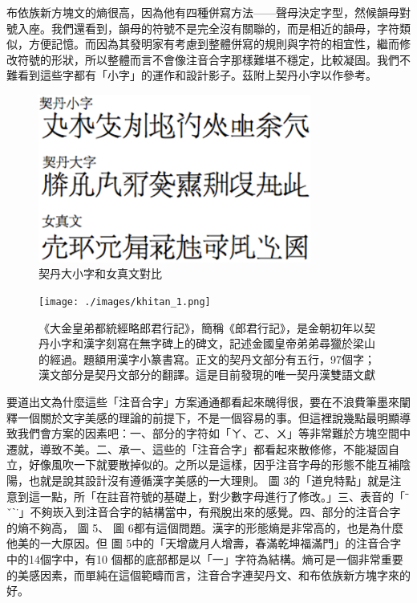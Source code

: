 \documentclass[a5paper, 10pt, openany]{book} %
\begin{document}
布依族新方塊文的熵很高，因為他有四種併寫方法——聲母決定字型，然候韻母對號入座。我們還看到，韻母的符號不是完全沒有關聯的，而是相近的韻母，字符類似，方便記憶。而因為其發明家有考慮到整體併寫的規則與字符的相宜性，繼而修改符號的形狀，所以整體而言不會像注音合字那樣難堪不穩定，比較凝固。我們不難看到這些字都有「小字」的運作和設計影子。茲附上契丹小字以作參考。

\begin{figure}[h]
  \centering
  \includegraphics[width=0.8\textwidth]{./images/gujinwenzijicheng.png}
  \caption{契丹大小字和女真文對比}
\end{figure}


\begin{figure}[h]
  \centering
  \texttt{[image: ./images/khitan\_1.png]}
  \caption{《大金皇弟都統經略郎君行記》，簡稱《郎君行記》，是金朝初年以契丹小字和漢字刻寫在無字碑上的碑文，記述金國皇帝弟弟尋獵於梁山的經過。題額用漢字小篆書寫。正文的契丹文部分有五行，97個字；漢文部分是契丹文部分的翻譯。這是目前發現的唯一契丹漢雙語文獻}
\end{figure}

 

 

要道出文為什麼這些「注音合字」方案通通都看起來醜得很，要在不浪費筆墨來闡釋一個關於文字美感的理論的前提下，不是一個容易的事。但這裡說幾點最明顯導致我們會方案的因素吧：一、部分的字符如「ㄚ、ㄛ、ㄨ」等非常難於方塊空間中遷就，導致不美。二、承一、這些的「注音合字」都看起來散修修，不能凝固自立，好像風吹一下就要散掉似的。之所以是這樣，因乎注音字母的形態不能互補陰陽，也就是說其設計沒有遵循漢字美感的一大理則。
圖 3的「道皃特點」就是注意到這一點，所「在註音符號的基礎上，對少數字母進行了修改。」三、表音的「ˉ ˇˋ˙」不夠崁入到注音合字的結構當中，有飛脫出來的感覺。四、部分的注音合字的熵不夠高，
圖 5、
圖 6都有這個問題。漢字的形態熵是非常高的，也是為什麼他美的一大原因。但
圖 5中的「天增歲月人增壽，春滿乾坤福滿門」的注音合字中的14個字中，有10 個都的底部都是以「一」字符為結構。熵可是一個非常重要的美感因素，而單純在這個範疇而言，注音合字連契丹文、和布依族新方塊字來的好。
\end{document}
